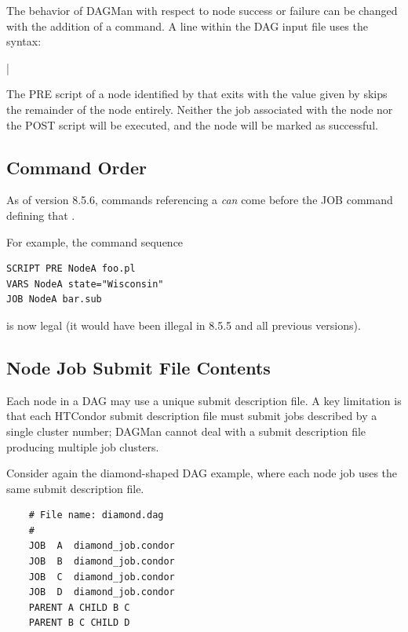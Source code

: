 The behavior of DAGMan with respect to node success or failure can
be changed with the addition of a  command. 
A  line within the DAG input file uses the syntax: 

 | 

The PRE script of a node identified by  that exits with the value 
given by 
skips the remainder of the node entirely.  
Neither the job associated with the node nor
the POST script will be executed,
and the node will be marked as successful.


\subsection{\label{sec:DAG-command_order}Command Order}
\label{dagman:command order}

As of version 8.5.6, commands referencing a  \emph{can}
come before the JOB command defining that .

For example, the command sequence
\begin{verbatim}
SCRIPT PRE NodeA foo.pl
VARS NodeA state="Wisconsin"
JOB NodeA bar.sub
\end{verbatim}
is now legal (it would have been illegal in 8.5.5 and all previous
versions).

\subsection{Node Job Submit File Contents}

Each node in a DAG may use a unique submit description file.
A key limitation is that
each HTCondor submit description file must submit jobs
described by a single cluster number;
DAGMan cannot deal with a submit description file producing
multiple job clusters.

Consider again the diamond-shaped DAG example, 
where each node job uses the same submit description file.

\begin{verbatim}
    # File name: diamond.dag
    #
    JOB  A  diamond_job.condor 
    JOB  B  diamond_job.condor 
    JOB  C  diamond_job.condor	
    JOB  D  diamond_job.condor
    PARENT A CHILD B C
    PARENT B C CHILD D
\end{verbatim}

